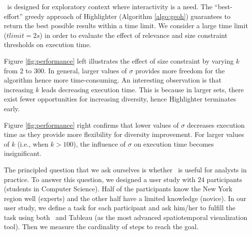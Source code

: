 

 \framework\ is designed for exploratory context where interactivity is a need. The ``best-effort'' greedy approach of {\sc Highlighter} (Algorithm \ref{algo:geoh}) guarantees to return the best possible results within a time limit. We consider a large time limit ($tlimit = 2s$) in order to evaluate the effect of relevance and size constraint thresholds on execution time.

Figure \ref{fig:performance} left illustrates the effect of size constraint by varying $k$ from $2$ to $300$. In general, larger values of $\sigma$ provides more freedom for the algorithm hence more time-consuming. An interesting observation is that increasing $k$ leads decreasing execution time. This is because in larger sets, there exist fewer opportunities for increasing diversity, hence {\sc Highlighter} terminates early.

Figure \ref{fig:performance} right confirms that lower values of $\sigma$ decreases execution time as they provide more flexibility for diversity improvement. For larger values of $k$ (i.e., when $k >100$), the influence of $\sigma$ on execution time becomes insignificant.

\vspace{5pt}
The principled question that we ask ourselves is whether \framework\ is useful for analysts in practice. To answer this question, we designed a user study with $24$ participants (students in Computer Science). Half of the participants know the New York region well (experts) and the other half have a limited knowledge (novice). In our user study, we define a task for each participant and ask him/her to fulfill the task using both \framework\ and {\sc Tableau} (as the most advanced spatiotemporal visualization tool). Then we measure the cardinality of steps to reach the goal.

